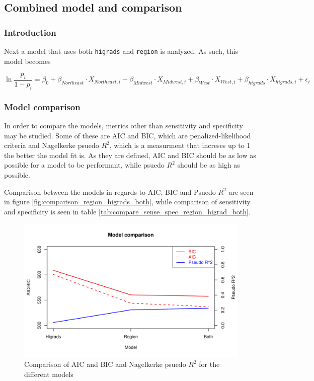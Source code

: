 \documentclass[a4paper]{article}
\begin{document}
\hypertarget{combined-model-and-comparison}{%
\subsection{Combined model and
comparison}\label{combined-model-and-comparison}}

\hypertarget{introduction-3}{%
\subsubsection{Introduction}\label{introduction-3}}

Next a model that uses both \texttt{higrads} and \texttt{region} is
analyzed. As such, this model becomes

\begin{equation}
  \ln{\frac{p_i}{1 - p_i}} = \beta_0 + \beta_{Northeast} \cdot X_{Northeast,i} + \beta_{Midwest} \cdot X_{Midwest,i} + \beta_{West} \cdot X_{West,i} + \beta_{higrads} \cdot X_{higrads,i} + \epsilon_i
\end{equation}

\hypertarget{model-comparison}{%
\subsubsection{Model comparison}\label{model-comparison}}

In order to compare the models, metrics other than sensitivity and
specificity may be studied. Some of these are AIC and BIC, which are
penalized-likelihood criteria and Nagelkerke psuedo \(R^2\), which is a
measurment that increses up to 1 the better the model fit is. As they
are defined, AIC and BIC should be as low as possible for a model to be
performant, while psuedo \(R^2\) should be as high as possible.

Comparison between the models in regards to AIC, BIC and Psuedo \(R^2\)
are seen in figure \ref{fig:comparison_region_higrads_both}, while
comparison of sensitivity and specificity is seen in table
\ref{tab:compare_sense_spec_region_higrad_both}.

\begin{figure}[h]
\includegraphics{Project_2_files/figure-latex/unnamed-chunk-8-1} \caption{\label{fig:comparison_region_higrads_both}Comparison of AIC and BIC and Nagelkerke psuedo $R^2$ for the different models}\label{fig:unnamed-chunk-8}
\end{figure}
\end{document}
